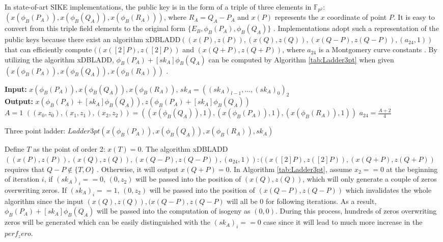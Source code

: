 \documentclass{iacrtrans}
\begin{document}
In state-of-art SIKE implementations, the public key is in the form of a triple of three elements in $\mathbb{F}_{p^2}$: $(x(\phi_B(P_A)), x(\phi_B(Q_A)), x(\phi_B(R_A)))$, where $R_A = Q_A-P_A$ and $x(P)$ represents the $x$ coordinate of point $P$. It is easy to convert from this triple field elements to the original form $\{E_B, \phi_B(P_A), \phi_B(Q_A)\}$ \cite{costello2016efficient}. Implementations adopt such a representation of the public keys because there exist an algorithm xDBLADD$((x(P), z(P)), (x(Q), z(Q)), (x(Q-P), z(Q-P)), (a_{24}, 1))$ that can efficiently compute $((x([2]P), z([2]P))$ and $(x(Q+P), z(Q+P))$, where $a_{24}$ is a Montgomery curve constants \cite{azarderakhsh2017supersingular}. By utilizing the algorithm xDBLADD, $\phi_B(P_A) + [sk_A]\phi_B(Q_A)$ can be computed by Algorithm \ref{tab:Ladder3pt} when given $(x(\phi_B(P_A)), x(\phi_B(Q_A)), x(\phi_B(R_A)))$ \cite{azarderakhsh2017supersingular} \cite{jao2011towards}.

\begin{algorithm}[H]
\SetAlgoLined
\textbf{Input: } $x(\phi_B(P_A)), x(\phi_B(Q_A)), x(\phi_B(R_A))$, $sk_A = ((sk_A)_{l-1}, ..., (sk_A)_{0})_2$ \\
\textbf{Output: } $x(\phi_B(P_A) + [sk_A]\phi_B(Q_A)), z(\phi_B(P_A) + [sk_A]\phi_B(Q_A))$ \\
$A=1$\;
$((x_0, z_0), (x_1, z_1), (x_2, z_2)) = ((x(\phi_B(Q_A)), 1), (x(\phi_B(P_A)), 1), (x(\phi_B(R_A)), 1))$\;
$a_{24} = \frac{A+2}{4}$\;
 {
}
\caption{Three point ladder: $Ladder3pt(x(\phi_B(P_A)), x(\phi_B(Q_A)), x(\phi_B(R_A)), sk_A)$}
\label{tab:Ladder3pt}
\end{algorithm}

Define $T$ as the point of order 2: $x(T) = 0$. The algorithm xDBLADD$((x(P), z(P)), (x(Q), z(Q)), (x(Q-P), z(Q-P)), (a_{24}, 1)): ((x([2]P), z([2]P)), (x(Q+P), z(Q+P))$ requires that $Q-P \not\in \{T,O\}$ \cite{costello2018montgomery}. Otherwise, it will output $x(Q+P)=0$. In Algorithm \ref{tab:Ladder3pt}, assume $x_2 == 0$ at the beginning of iteration $i$, if $(sk_A)_{i}==0$, $(0, z_2)$ will be passed into the position of $(x(Q), z(Q))$, which will only generate a couple of zeros overwriting zeros. If $(sk_A)_{i}==1$, $(0, z_2)$ will be passed into the position of $(x(Q-P), z(Q-P))$ which invalidates the whole algorithm since the input $(x(Q), z(Q)), (x(Q-P), z(Q-P)$ will all be $0$ for following iterations. As a result, $\phi_B(P_A) + [sk_A]\phi_B(Q_A)$ will be passed into the computation of isogeny as $(0,0)$. During this process, hundreds of zeros overwriting zeros will be generated which can be easily distinguished with the $(sk_A)_{i}==0$ case since it will lead to much more increase in the $perf_zero$.
\end{document}
